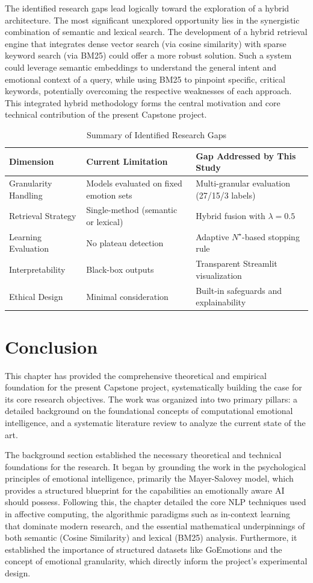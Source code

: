 The identified research gaps lead logically toward the exploration of a hybrid architecture. The most significant unexplored opportunity lies in the synergistic combination of semantic and lexical search. The development of a hybrid retrieval engine that integrates dense vector search (via cosine similarity) with sparse keyword search (via BM25) could offer a more robust solution. Such a system could leverage semantic embeddings to understand the general intent and emotional context of a query, while using BM25 to pinpoint specific, critical keywords, potentially overcoming the respective weaknesses of each approach. This integrated hybrid methodology forms the central motivation and core technical contribution of the present Capstone project.
\begin{table}[H]
\centering
\caption{Summary of Identified Research Gaps}
\begin{tabular}{|p{4cm}|p{4cm}|p{6cm}|}
\hline
\textbf{Dimension} & \textbf{Current Limitation} & \textbf{Gap Addressed by This Study} \\ \hline
Granularity Handling & Models evaluated on fixed emotion sets & Multi-granular evaluation (27/15/3 labels) \\ \hline
Retrieval Strategy & Single-method (semantic or lexical) & Hybrid fusion with $\lambda=0.5$ \\ \hline
Learning Evaluation & No plateau detection & Adaptive $N^{\star}$-based stopping rule \\ \hline
Interpretability & Black-box outputs & Transparent Streamlit visualization \\ \hline
Ethical Design & Minimal consideration & Built-in safeguards and explainability \\ \hline
\end{tabular}
\end{table}
\section {Conclusion}

This chapter has provided the comprehensive theoretical and empirical foundation for the present Capstone project, systematically building the case for its core research objectives. The work was organized into two primary pillars: a detailed background on the foundational concepts of computational emotional intelligence, and a systematic literature review to analyze the current state of the art.

The background section established the necessary theoretical and technical foundations for the research. It began by grounding the work in the psychological principles of emotional intelligence, primarily the Mayer-Salovey model, which provides a structured blueprint for the capabilities an emotionally aware AI should possess. Following this, the chapter detailed the core NLP techniques used in affective computing, the algorithmic paradigms such as in-context learning that dominate modern research, and the essential mathematical underpinnings of both semantic (Cosine Similarity) and lexical (BM25) analysis. Furthermore, it established the importance of structured datasets like GoEmotions and the concept of emotional granularity, which directly inform the project's experimental design.

